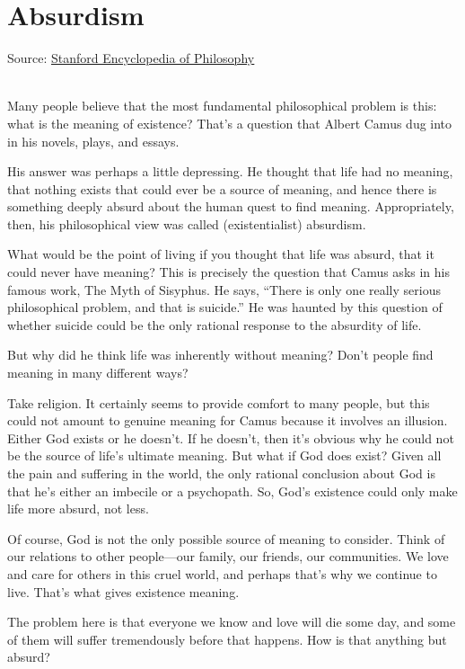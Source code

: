 \section{Absurdism}

Source: \href{https://plato.stanford.edu/entries/camus/#SuiAbsHapMytSis}{\underline{Stanford Encyclopedia of Philosophy}}\\\

Many people believe that the most fundamental philosophical problem is this: what is the meaning of existence? That’s a question that Albert Camus dug into in his novels, plays, and essays.

His answer was perhaps a little depressing. He thought that life had no meaning, that nothing exists that could ever be a source of meaning, and hence there is something deeply absurd about the human quest to find meaning. Appropriately, then, his philosophical view was called (existentialist) absurdism.

What would be the point of living if you thought that life was absurd, that it could never have meaning? This is precisely the question that Camus asks in his famous work, The Myth of Sisyphus. He says, “There is only one really serious philosophical problem, and that is suicide.” He was haunted by this question of whether suicide could be the only rational response to the absurdity of life.

But why did he think life was inherently without meaning? Don’t people find meaning in many different ways?

Take religion. It certainly seems to provide comfort to many people, but this could not amount to genuine meaning for Camus because it involves an illusion. Either God exists or he doesn’t. If he doesn’t, then it’s obvious why he could not be the source of life’s ultimate meaning. But what if God does exist? Given all the pain and suffering in the world, the only rational conclusion about God is that he’s either an imbecile or a psychopath. So, God’s existence could only make life more absurd, not less.

Of course, God is not the only possible source of meaning to consider. Think of our relations to other people—our family, our friends, our communities. We love and care for others in this cruel world, and perhaps that’s why we continue to live. That’s what gives existence meaning.

The problem here is that everyone we know and love will die some day, and some of them will suffer tremendously before that happens. How is that anything but absurd?

